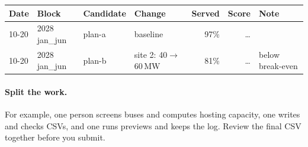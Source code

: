 \documentclass[10pt]{article}
\newcommand{\MW}{\ensuremath{\,\mathrm{MW}}}
\begin{document}
\begin{center}
\small
\begin{tabular}{@{}l l l l r r l@{}}
\toprule
Date & Block & Candidate & Change & Served & Score & Note\\
\midrule
10-20 & 2028 jan\_jun & plan-a & baseline & 97\% & \ldots & \\
10-20 & 2028 jan\_jun & plan-b & site 2: 40$\to$60\MW & 81\% & \ldots & below break-even\\
\bottomrule
\end{tabular}
\end{center}

\paragraph{Split the work.} For example, one person screens buses and computes
hosting capacity, one writes and checks CSVs, and one runs previews and keeps
the log. Review the final CSV together before you submit.




\end{document}
